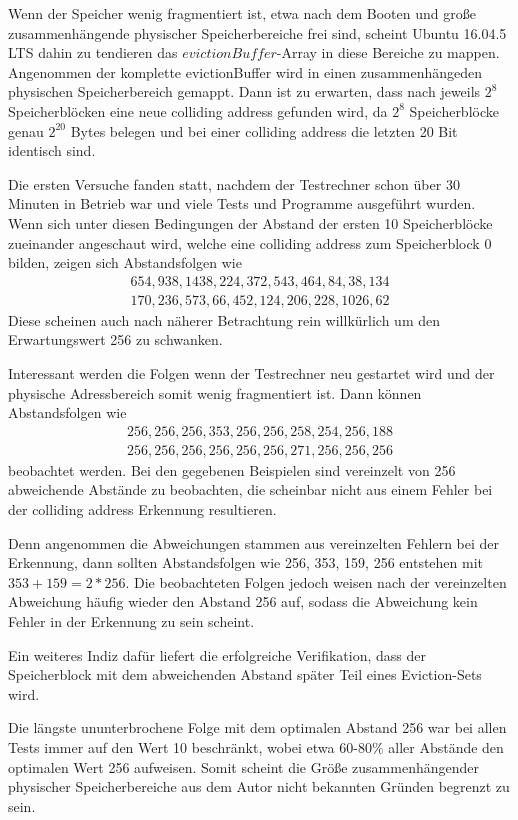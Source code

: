 Wenn der Speicher wenig fragmentiert ist, etwa nach dem Booten und große zusammenhängende physischer Speicherbereiche frei sind, scheint Ubuntu 16.04.5 LTS dahin zu tendieren das $evictionBuffer$-Array in diese Bereiche zu mappen.
Angenommen der komplette evictionBuffer wird in einen zusammenhängeden physischen Speicherbereich gemappt. Dann ist zu erwarten, dass nach jeweils $2^8$ Speicherblöcken eine neue colliding address gefunden wird, da $2^8$ Speicherblöcke genau $2^20$ Bytes belegen und bei einer colliding address die letzten 20 Bit identisch sind.

Die ersten Versuche fanden statt, nachdem der Testrechner schon über 30 Minuten in Betrieb war und viele Tests und Programme ausgeführt wurden.
Wenn sich unter diesen Bedingungen der Abstand der ersten 10 Speicherblöcke zueinander angeschaut wird, welche eine colliding address zum Speicherblock 0 bilden, zeigen sich Abstandsfolgen wie 
\begin{align*} 
654, 938, 1438, 224, 372, 543, 464, 84, 38, 134\\
170, 236, 573, 66, 452, 124, 206, 228, 1026, 62
\end{align*}
Diese scheinen auch nach näherer Betrachtung rein willkürlich um den Erwartungswert 256 zu schwanken.

Interessant werden die Folgen wenn der Testrechner neu gestartet wird und der physische Adressbereich somit wenig fragmentiert ist.
Dann können Abstandsfolgen wie 
\begin{align*} 
256, 256, 256, 353, 256, 256, 258, 254, 256, 188\\
256, 256, 256, 256, 256, 256, 271, 256, 256, 256
\end{align*}
beobachtet werden.
Bei den gegebenen Beispielen sind vereinzelt von 256 abweichende Abstände zu beobachten, die scheinbar nicht aus einem Fehler bei der colliding address Erkennung resultieren.

Denn angenommen die Abweichungen stammen aus vereinzelten Fehlern bei der Erkennung, dann sollten Abstandsfolgen wie 256, 353, 159, 256 entstehen mit $353+159=2*256$.
Die beobachteten Folgen jedoch weisen nach der vereinzelten Abweichung häufig wieder den Abstand 256 auf, sodass die Abweichung kein Fehler in der Erkennung zu sein scheint.

Ein weiteres Indiz dafür liefert die erfolgreiche Verifikation, dass der Speicherblock mit dem abweichenden Abstand später Teil eines Eviction-Sets wird.

Die längste ununterbrochene Folge mit dem optimalen Abstand 256 war bei allen Tests immer auf den Wert 10 beschränkt, wobei etwa 60-80\% aller Abstände den optimalen Wert 256 aufweisen.
Somit scheint die Größe zusammenhängender physischer Speicherbereiche aus dem Autor nicht bekannten Gründen begrenzt zu sein.

